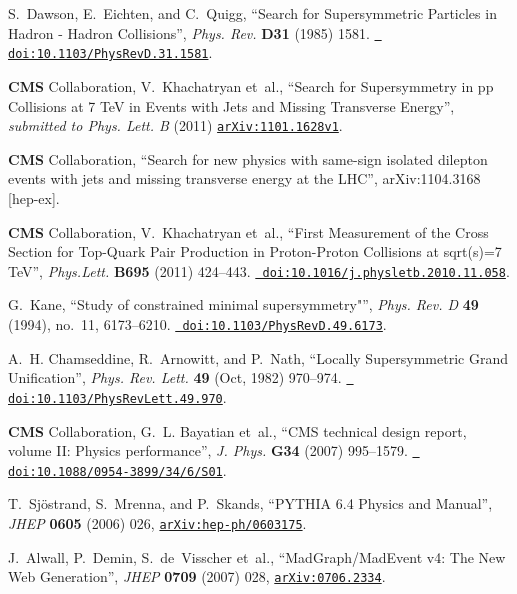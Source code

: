 \begin{thebibliography}{10}
S.~Dawson, E.~Eichten, and C.~Quigg, ``{Search for Supersymmetric Particles in
  Hadron - Hadron Collisions}'', {\em Phys. Rev.} {\bf D31} (1985) 1581.
  \href{http://dx.doi.org/10.1103/PhysRevD.31.1581}{{\tt
  doi:10.1103/PhysRevD.31.1581}}.

{\bf CMS} Collaboration, V.~Khachatryan {et~al.}, ``Search for Supersymmetry in
  pp Collisions at 7 TeV in Events with Jets and Missing Transverse Energy'',
  {\em submitted to Phys. Lett. B} (2011)
  \href{http://www.arXiv.org/abs/1101.1628v1}{{\tt arXiv:1101.1628v1}}.

{\bf CMS} Collaboration, 
``Search for new physics with same-sign isolated dilepton events with jets and missing transverse energy at the LHC'',
arXiv:1104.3168 [hep-ex].

{\bf CMS} Collaboration, V.~Khachatryan {et~al.}, ``{First Measurement of the
  Cross Section for Top-Quark Pair Production in Proton-Proton Collisions at
  sqrt(s)=7 TeV}'', {\em Phys.Lett.} {\bf B695} (2011) 424--443.
  \href{http://dx.doi.org/10.1016/j.physletb.2010.11.058}{{\tt
  doi:10.1016/j.physletb.2010.11.058}}.

G.~Kane, ``Study of constrained minimal supersymmetry"'', {\em Phys. Rev. D}
  {\bf 49} (1994), no.~11, 6173--6210.
  \href{http://dx.doi.org/10.1103/PhysRevD.49.6173}{{\tt
  doi:10.1103/PhysRevD.49.6173}}.

A.~H. Chamseddine, R.~Arnowitt, and P.~Nath, ``Locally Supersymmetric Grand
  Unification'', {\em Phys. Rev. Lett.} {\bf 49} (Oct, 1982) 970--974.
  \href{http://dx.doi.org/10.1103/PhysRevLett.49.970}{{\tt
  doi:10.1103/PhysRevLett.49.970}}.

{\bf CMS} Collaboration, G.~L. Bayatian {et~al.}, ``{CMS technical design
  report, volume II: Physics performance}'', {\em J. Phys.} {\bf G34} (2007)
995--1579.
  \href{http://dx.doi.org/10.1088/0954-3899/34/6/S01}{{\tt
  doi:10.1088/0954-3899/34/6/S01}}.



T.~Sj\"ostrand, S.~Mrenna, and P.~Skands, ``PYTHIA 6.4 Physics and Manual'',
  {\em JHEP} {\bf 0605} (2006) 026,
  \href{http://www.arXiv.org/abs/hep-ph/0603175}{{\tt arXiv:hep-ph/0603175}}.

J.~Alwall, P.~Demin, S.~de~Visscher{ et~al.}, ``MadGraph/MadEvent v4: The New
  Web Generation'', {\em JHEP} {\bf 0709} (2007) 028,
  \href{http://www.arXiv.org/abs/0706.2334}{{\tt arXiv:0706.2334}}.


\end{thebibliography}
